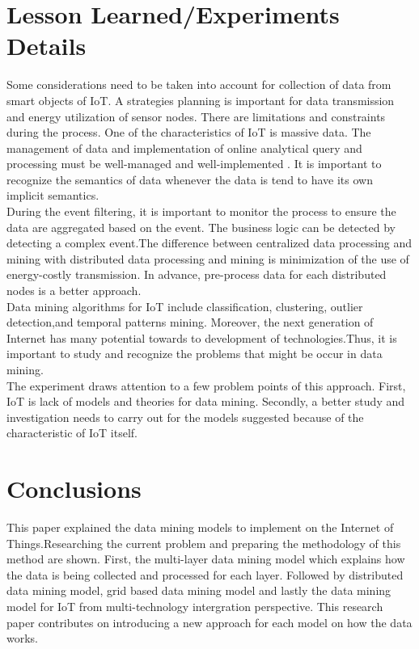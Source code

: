 \documentclass[a4paper,12pt]{article}
\begin{document}
{\section{Lesson Learned/Experiments Details}
Some considerations need to be taken into account for collection of data from smart objects of IoT. A strategies planning is important for data transmission and energy utilization of sensor nodes. There are limitations and constraints during the process.
One of the characteristics of IoT is massive data. The management of data  and implementation of online analytical query and processing must be well-managed and well-implemented . It is important to recognize the semantics of data whenever the data is tend to have its own implicit semantics.\\
\indent
During the event filtering, it is important to monitor the process to ensure the data are aggregated based on the event. The business logic can be detected by detecting a complex event.The difference between centralized data processing and mining with distributed data processing and mining is minimization of the use of energy-costly transmission. In advance, pre-process data for each distributed nodes is a better approach.\\
\indent
Data mining algorithms for IoT include classification, clustering, outlier detection,and temporal patterns mining. Moreover, the next generation of Internet has many potential towards to development of technologies.Thus, it is important to study and recognize the problems that might be occur in data mining.\\
\indent
The experiment draws attention to a few problem points of this approach.  First,  IoT is lack of models and theories for data mining. Secondly, a better study and investigation needs to carry out for the models suggested because  of  the characteristic of IoT itself.  
\section{Conclusions}
This paper explained the data mining models to implement on the Internet of Things.Researching the current problem and preparing the methodology of this method are shown. First, the multi-layer data mining model which explains how the data is being collected and processed for each layer. Followed by distributed data mining model, grid based data mining model and lastly the data mining model for IoT from multi-technology intergration perspective. This research paper contributes on introducing a new approach for each model on how the data works.
}
\end{document}
